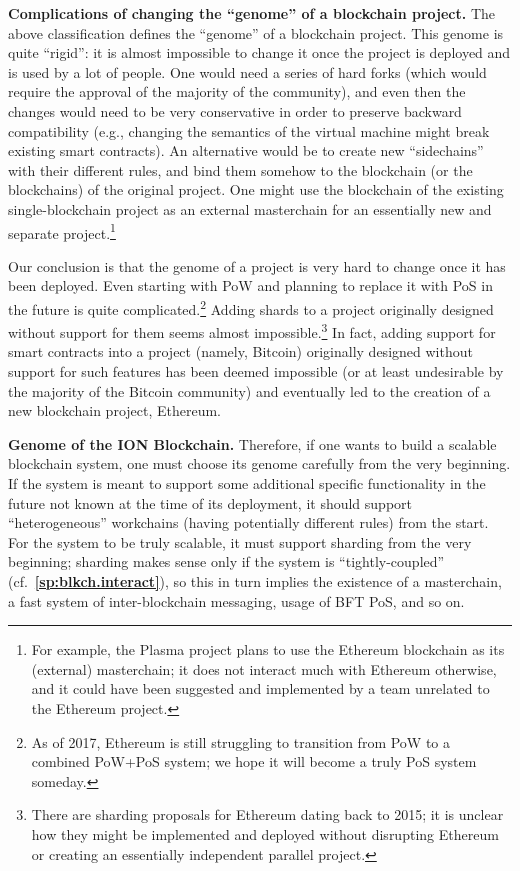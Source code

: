 \documentclass[12pt,oneside]{article}
\def\makepoint#1{\medbreak\noindent{\bf #1.\ }}
\def\nxsubpoint{\refstepcounter{subsubsection}%
  \smallbreak\makepoint{\thesubsubsection}}
\def\refpoint#1{{\rm\textbf{\ref{#1}}}}
\let\ptref=\refpoint
\def\embt(#1.){\textbf{#1.}}
\begin{document}
\nxsubpoint\label{sp:genome.change.never} \embt(Complications of
changing the ``genome'' of a blockchain project.)  The above
classification defines the ``genome'' of a blockchain project. This
genome is quite ``rigid'': it is almost impossible to change it once
the project is deployed and is used by a lot of people. One would need
a series of hard forks (which would require the approval of the
majority of the community), and even then the changes would need to be
very conservative in order to preserve backward compatibility (e.g.,
changing the semantics of the virtual machine might break existing
smart contracts). An alternative would be to create new ``sidechains''
with their different rules, and bind them somehow to the blockchain
(or the blockchains) of the original project. One might use the
blockchain of the existing single-blockchain project as an external
masterchain for an essentially new and separate project.\footnote{For
  example, the Plasma project plans to use the Ethereum blockchain as
  its (external) masterchain; it does not interact much with Ethereum
  otherwise, and it could have been suggested and implemented by a
  team unrelated to the Ethereum project.}

Our conclusion is that the genome of a project is very hard to change
once it has been deployed. Even starting with PoW and planning to
replace it with PoS in the future is quite complicated.\footnote{As of
  2017, Ethereum is still struggling to transition from PoW to a
  combined PoW+PoS system; we hope it will become a truly PoS system
  someday.} Adding shards to a project originally designed without
support for them seems almost impossible.\footnote{There are sharding
  proposals for Ethereum dating back to 2015; it is unclear how they
  might be implemented and deployed without disrupting Ethereum or
  creating an essentially independent parallel project.} In fact,
adding support for smart contracts into a project (namely, Bitcoin)
originally designed without support for such features has been deemed
impossible (or at least undesirable by the majority of the Bitcoin
community) and eventually led to the creation of a new blockchain
project, Ethereum.

\nxsubpoint \embt(Genome of the ION Blockchain.)  Therefore, if one
wants to build a scalable blockchain system, one must choose its
genome carefully from the very beginning. If the system is meant to
support some additional specific functionality in the future not known
at the time of its deployment, it should support ``heterogeneous''
workchains (having potentially different rules) from the start. For
the system to be truly scalable, it must support sharding from the
very beginning; sharding makes sense only if the system is
``tightly-coupled'' (cf.~\ptref{sp:blkch.interact}), so this in turn
implies the existence of a masterchain, a fast system of
inter-blockchain messaging, usage of BFT PoS, and so on.
\end{document}
